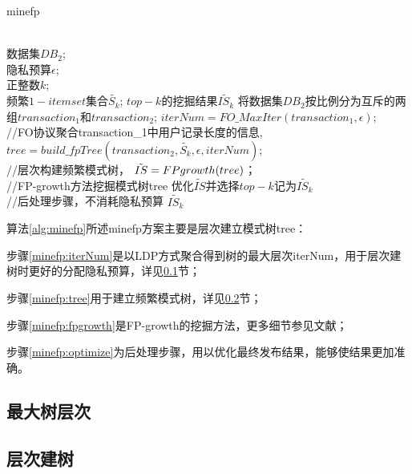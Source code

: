 \documentclass[UTF8]{ctexart}
\begin{document}
\begin{algorithm}[t]
    \caption{minefp}
    \label{alg:minefp}
        \begin{algorithmic}[1]
			 \REQUIRE ~~\\
			 数据集$DB_2$;\\
			 隐私预算$\epsilon$;\\
			 正整数$k$;\\
			 频繁$1-itemset$集合$\tilde{S_k}$;
			 \ENSURE $top-k$的挖掘结果$\tilde{IS_k}$
                 \STATE 将数据集$DB_2$按比例分为互斥的两组$transaction_1$和$transaction_2$;
                 \label{minefp:group}
			 \STATE $iterNum = FO\_MaxIter(transaction_1,\epsilon)$; \\ //FO协议聚合transaction\_1中用户记录长度的信息,%
			 \label{minefp:iterNum}
			 \STATE $tree = build\_fpTree(transaction_2,\tilde{S_k},\epsilon,iterNum)$; \\ //层次构建频繁模式树，%
			 \label{minefp:tree}
			 \STATE $\tilde{IS} = FP\-growth(tree)$； \\ //FP-growth方法挖掘模式树tree
                 \label{minefp:fpgrowth}
			 \STATE 优化$\tilde{IS}$并选择$top-k$记为$\tilde{IS_k}$ \\ //后处理步骤，不消耗隐私预算
                 \label{minefp:optimize}
                 \RETURN $\tilde{IS_k}$
        \end{algorithmic}
\end{algorithm}


算法\ref{alg:minefp}所述minefp方案主要是层次建立模式树tree：

步骤\ref{minefp:iterNum}是以LDP方式聚合得到树的最大层次iterNum，用于层次建树时更好的分配隐私预算，详见\ref{section:MaxIter}节；

步骤\ref{minefp:tree}用于建立频繁模式树，详见\ref{section:buildTree}节；

步骤\ref{minefp:fpgrowth}是FP-growth的挖掘方法，更多细节参见文献\cite{han2000mining}；

步骤\ref{minefp:optimize}为后处理步骤，用以优化最终发布结果，能够使结果更加准确。


\subsection{最大树层次}
\label{section:MaxIter}

\subsection{层次建树}
\label{section:buildTree}
\end{document}
